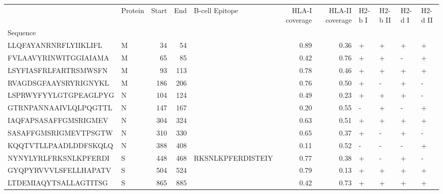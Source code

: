 \begin{tabular}{llrrlrrllll}
\toprule
{} & Protein &  Start &   End &     B-cell Epitope &  HLA-I coverage &  HLA-II coverage & H2-b I & H2-b II & H2-d I & H2-d II \\
Sequence              &         &        &       &                    &                 &                  &        &         &        &         \\
\midrule
LLQFAYANRNRFLYIIKLIFL &       M &     34 &    54 &                    &            0.89 &             0.36 &      + &       + &      + &       + \\
FVLAAVYRINWITGGIAIAMA &       M &     65 &    85 &                    &            0.42 &             0.76 &      + &       + &      - &       + \\
LSYFIASFRLFARTRSMWSFN &       M &     93 &   113 &                    &            0.78 &             0.46 &      + &       + &      + &       + \\
RVAGDSGFAAYSRYRIGNYKL &       M &    186 &   206 &                    &            0.76 &             0.50 &      + &       - &      + &       - \\
LSPRWYFYYLGTGPEAGLPYG &       N &    104 &   124 &                    &            0.49 &             0.23 &      + &       + &      + &       - \\
GTRNPANNAAIVLQLPQGTTL &       N &    147 &   167 &                    &            0.20 &             0.55 &      - &       + &      - &       + \\
IAQFAPSASAFFGMSRIGMEV &       N &    304 &   324 &                    &            0.63 &             0.51 &      + &       + &      + &       + \\
SASAFFGMSRIGMEVTPSGTW &       N &    310 &   330 &                    &            0.65 &             0.37 &      + &       - &      + &       - \\
KQQTVTLLPAADLDDFSKQLQ &       N &    388 &   408 &                    &            0.11 &             0.52 &      - &       - &      - &       + \\
NYNYLYRLFRKSNLKPFERDI &       S &    448 &   468 &  RKSNLKPFERDISTEIY &            0.77 &             0.38 &      + &       - &      + &       - \\
GYQPYRVVVLSFELLHAPATV &       S &    504 &   524 &                    &            0.79 &             0.13 &      + &       + &      + &       + \\
LTDEMIAQYTSALLAGTITSG &       S &    865 &   885 &                    &            0.42 &             0.73 &      + &       + &      + &       + \\

\end{tabular}

